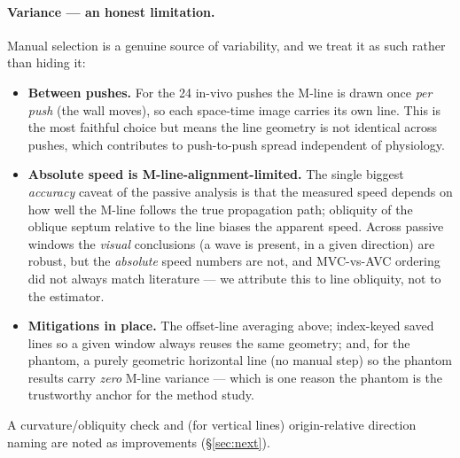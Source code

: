 \documentclass[11pt,a4paper]{article}
\begin{document}
\paragraph{Variance --- an honest limitation.} Manual selection is a genuine source of variability, and we
treat it as such rather than hiding it:
\begin{itemize}
  \item \textbf{Between pushes.} For the 24 in-vivo pushes the M-line is drawn once \emph{per push} (the wall
  moves), so each space-time image carries its own line. This is the most faithful choice but means the line
  geometry is not identical across pushes, which contributes to push-to-push spread independent of physiology.
  \item \textbf{Absolute speed is M-line-alignment-limited.} The single biggest \emph{accuracy} caveat of the
  passive analysis is that the measured speed depends on how well the M-line follows the true propagation
  path; obliquity of the oblique septum relative to the line biases the apparent speed. Across passive windows
  the \emph{visual} conclusions (a wave is present, in a given direction) are robust, but the \emph{absolute}
  speed numbers are not, and MVC-vs-AVC ordering did not always match literature --- we attribute this to
  line obliquity, not to the estimator.
  \item \textbf{Mitigations in place.} The offset-line averaging above; index-keyed saved lines so a given
  window always reuses the same geometry; and, for the phantom, a purely geometric horizontal line (no manual
  step) so the phantom results carry \emph{zero} M-line variance --- which is one reason the phantom is the
  trustworthy anchor for the method study.
\end{itemize}
A curvature/obliquity check and (for vertical lines) origin-relative direction naming are noted as
improvements (\S\ref{sec:next}).

\end{document}
